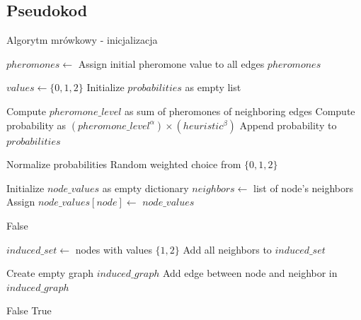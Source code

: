 \subsection{Pseudokod}
\begin{algorithm}
    \caption*{Algorytm mrówkowy - inicjalizacja}
    \begin{algorithmic}[1]
    
        \State $pheromones \gets$ Assign initial pheromone value to all edges
        \State \Return $pheromones$
    \EndFunction

        \State $values \gets \{0, 1, 2\}$
        \State Initialize $probabilities$ as empty list

            \State Compute $pheromone\_level$ as sum of pheromones of neighboring edges
            \State Compute probability as $(pheromone\_level^\alpha) \times (heuristic^\beta)$
            \State Append probability to $probabilities$
        \EndFor

        \State Normalize probabilities
        \State \Return Random weighted choice from $\{0, 1, 2\}$
    \EndFunction

        \State Initialize $node\_values$ as empty dictionary
            \State $neighbors \gets$ list of node's neighbors
            \State Assign $node\_values[node] \gets$ 
        \EndFor
        \State \Return $node\_values$
    \EndFunction

                \State \Return False
            \EndIf
        \EndFor

        \State $induced\_set \gets$ nodes with values $\{1, 2\}$
            \State Add all neighbors to $induced\_set$
        \EndFor

        \State Create empty graph $induced\_graph$
                        \State Add edge between node and neighbor in $induced\_graph$
                    \EndIf
                \EndFor
            \EndIf
        \EndFor

            \State \Return False
        \EndIf
        \State \Return True
    \EndFunction
    
    \end{algorithmic}
\end{algorithm}

